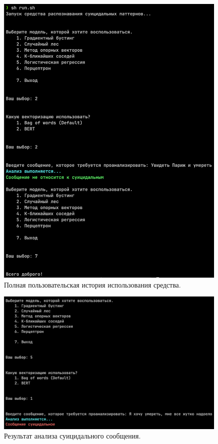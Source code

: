 \begin{figure}[H]
	\centering
	\includegraphics[width=\textwidth]{inc/utility1.png}
	\caption{ Полная пользовательская история использования средства. }
	\label{img:utility1}
\end{figure}

\begin{figure}[H]
	\centering
	\includegraphics[width=\textwidth]{inc/utility2.png}
	\caption{ Результат анализа суицидального сообщения. }
	\label{img:utility2}
\end{figure}

